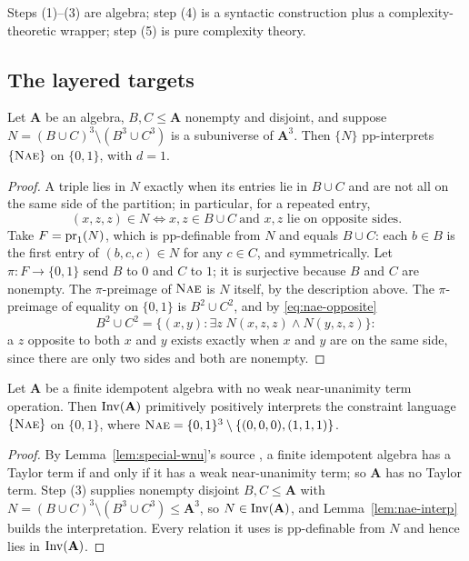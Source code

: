 Steps (1)--(3) are algebra; step (4) is a syntactic construction plus a
complexity-theoretic wrapper; step (5) is pure complexity theory.

\subsection{The layered targets}

\begin{lemma}\label{lem:nae-interp}
Let $\mathbf A$ be an algebra, $B,C\le\mathbf A$ nonempty and disjoint, and
suppose $N=(B\cup C)^{3}\setminus(B^{3}\cup C^{3})$ is a subuniverse of
$\mathbf A^{3}$. Then $\{N\}$ pp-interprets $\{\textsc{Nae}\}$ on $\{0,1\}$,
with $d=1$.
\end{lemma}

\begin{proof}
A triple lies in $N$ exactly when its entries lie in $B\cup C$ and are not all
on the same side of the partition; in particular, for a repeated entry,
\begin{equation}\label{eq:nae-opposite}
  (x,z,z)\in N\iff x,z\in B\cup C\ \text{and $x,z$ lie on opposite sides.}
\end{equation}
Take $F=\operatorname*{pr}_{1}(N)$, which is pp-definable from $N$ and equals $B\cup C$:
each $b\in B$ is the first entry of $(b,c,c)\in N$ for any $c\in C$, and
symmetrically. Let $\pi\colon F\to\{0,1\}$ send $B$ to $0$ and $C$ to $1$; it is
surjective because $B$ and $C$ are nonempty. The $\pi$-preimage of
$\textsc{Nae}$ is $N$ itself, by the description above. The $\pi$-preimage of
equality on $\{0,1\}$ is $B^{2}\cup C^{2}$, and by \eqref{eq:nae-opposite}
\[
  B^{2}\cup C^{2}=\{(x,y):\exists z\;N(x,z,z)\wedge N(y,z,z)\} :
\]
a $z$ opposite to both $x$ and $y$ exists exactly when $x$ and $y$ are on the
same side, since there are only two sides and both are nonempty.
\end{proof}

\begin{theorem}\label{thm:h0}
Let $\mathbf A$ be a finite idempotent algebra with no weak near-unanimity term
operation. Then $\operatorname{Inv}(\mathbf A)$ primitively positively interprets the
constraint language $\{\textsc{Nae}\}$ on $\{0,1\}$, where
$\textsc{Nae}=\{0,1\}^{3}\setminus\{(0,0,0),(1,1,1)\}$.
\end{theorem}

\begin{proof}
By Lemma~\ref{lem:special-wnu}'s source \cite{MarotiMcKenzie}, a finite
idempotent algebra has a Taylor term if and only if it has a weak
near-unanimity term; so $\mathbf A$ has no Taylor term. Step \textup{(3)}
supplies nonempty disjoint $B,C\le\mathbf A$ with
$N=(B\cup C)^{3}\setminus(B^{3}\cup C^{3})\le\mathbf A^{3}$, so
$N\in\operatorname{Inv}(\mathbf A)$, and Lemma~\ref{lem:nae-interp} builds the
interpretation. Every relation it uses is pp-definable from $N$ and hence lies
in $\operatorname{Inv}(\mathbf A)$.
\end{proof}

